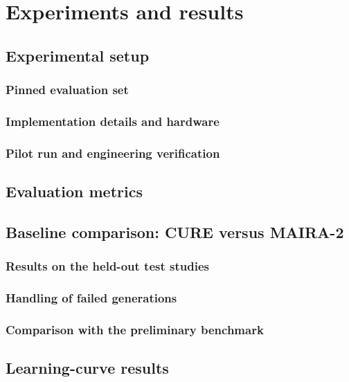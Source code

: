\chapter{Experiments and results}
\label{ch:results}


\section{Experimental setup}
\subsection{Pinned evaluation set}
\subsection{Implementation details and hardware}
\subsection{Pilot run and engineering verification}

\section{Evaluation metrics}

\section{Baseline comparison: CURE versus MAIRA-2}\label{sec:baseline}
\subsection{Results on the held-out test studies}
\subsection{Handling of failed generations}
\subsection{Comparison with the preliminary benchmark}

\section{Learning-curve results}\label{sec:curve}
